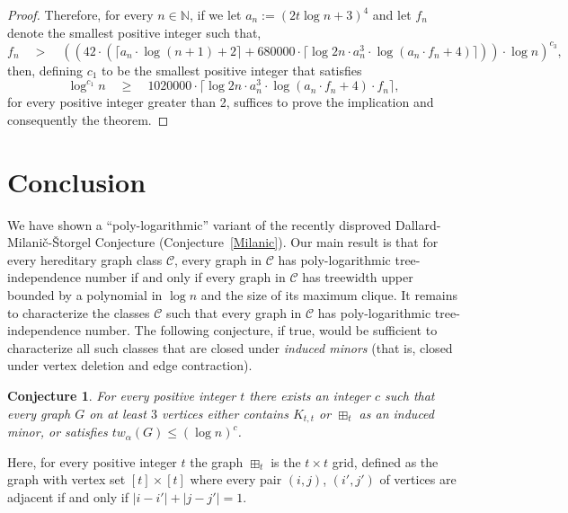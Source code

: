 \documentclass[11pt]{amsart}
\newtheorem{conjecture}{Conjecture}[section]
\newcommand{\cal}{\mathcal}
\newcommand{\tw}{tw\xspace}
\newcommand{\atw}{tw_{\alpha}\xspace}
\begin{document}
\begin{proof}
    Therefore, for every $n\in \mathbb{N}$, if we let $a_n := (2t \log n + 3)^4$ and let $f_n$ denote the smallest positive integer such that,
    $$ 
    f_n \quad
    > \quad (({ 42} \cdot 
    (\lceil a_n \cdot{\log (n+1)}+ 2\rceil + 680000 \cdot \lceil \log 2n \cdot a_n^3 \cdot { \log(a_n \cdot f_n + 4)}\rceil)) \cdot
    \log n)^{c_3},
    $$
    then, defining $c_1$ to be the smallest positive integer that satisfies 
    $$
    \log^{c_1} n \quad 
    \geq \quad 1020000 \cdot \lceil \log 2n \cdot a_n^3 \cdot { \log(a_n \cdot f_n + 4)} \cdot f_n \rceil,
    $$ 
    for every positive integer greater than 2, suffices to prove the implication and consequently the theorem.
\end{proof}


\section{Conclusion}\label{sec:conclusion}
We have shown a ``poly-logarithmic'' variant of the recently disproved Dallard-Milani\v{c}-{\v{S}}torgel Conjecture 
(Conjecture~\ref{Milanic}). Our main result is that for every hereditary graph class ${\cal C}$, every graph in ${\cal C}$ has poly-logarithmic tree-independence number if and only if every graph in ${\cal C}$ has treewidth upper bounded by a polynomial in $\log n$ and the size of its maximum clique. 
%
It remains to characterize the classes ${\cal C}$ such that every graph in ${\cal C}$ has poly-logarithmic tree-independence number. The following conjecture, if true, would be sufficient to characterize all such classes that are closed under {\em induced minors} (that is, closed under vertex deletion and edge contraction). 
%
\begin{conjecture}
For every positive integer $t$ there exists an integer $c$ such that every graph $G$ on at least $3$ vertices either contains $K_{t,t}$ or $\boxplus_t$ as an induced minor, or satisfies $\atw(G) \leq (\log n)^c$.
\end{conjecture}
%
Here, for every positive integer $t$ the graph $\boxplus_t$ is the $t \times t$ grid, defined as the graph with vertex set $[t] \times [t]$ where every pair $(i, j)$, $(i', j')$ of vertices are adjacent if and only if $|i-i'| + |j-j'| = 1$.
\end{document}
